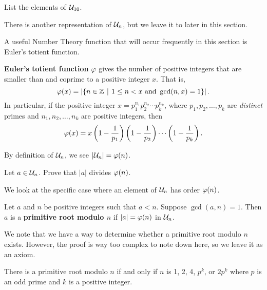 \begin{exercise}
    List the elements of $\mathcal{U}_{10}$.
\end{exercise}

There is another representation of $\mathcal{U}_{n}$, but we leave it to later in this section.

A useful Number Theory function that will occur frequently in this section is Euler's totient function.

\begin{definition}
    \textbf{Euler's totient function} $\varphi$ gives the number of positive integers that are smaller than and coprime to a positive integer $x$. That is,
    \[
        \totient(x) = \left|\{n \in \Z \vert 1 \leq n < x \text{ and } \gcd(n, x) = 1\}\right|.
    \]
    In particular, if the positive integer $x = p_1^{n_1}p_2^{n_2}\cdots p_k^{n_k}$, where $p_1, p_2, \dots, p_k$ are \textit{distinct} primes and $n_1,n_2,\dots,n_k$ are positive integers, then
    \[
        \varphi(x) = x \left(1 - \frac1{p_1}\right)\left(1 - \frac1{p_2}\right)\cdots\left(1 - \frac1{p_k}\right).
    \]
\end{definition}
\begin{remark}
    By definition of $\mathcal{U}_{n}$, we see $|\mathcal{U}_{n}| = \varphi(n)$.
\end{remark}

\begin{exercise}\label{exercise-order-of-a-divides-phi-a}
    Let $a \in \mathcal{U}_{n}$. Prove that $|a|$ divides $\varphi(n)$.
\end{exercise}

We look at the specific case where an element of $\mathcal{U}_{n}$ has order $\varphi(n)$.
\begin{definition}
    Let $a$ and $n$ be positive integers such that $a < n$. Suppose $\gcd(a, n) = 1$. Then $a$ is a \textbf{primitive root modulo $n$} if $|a| = \varphi(n)$ in $\mathcal{U}_{n}$.
\end{definition}

We note that we have a way to determine whether a primitive root modulo $n$ exists. However, the proof is way too complex to note down here, so we leave it as an axiom.
\begin{axiom}\label{axiom-primitive-root-modulo-p}
    There is a primitive root modulo $n$ if and only if $n$ is 1, 2, 4, $p^k$, or $2p^k$ where $p$ is an odd prime and $k$ is a positive integer.
\end{axiom}

